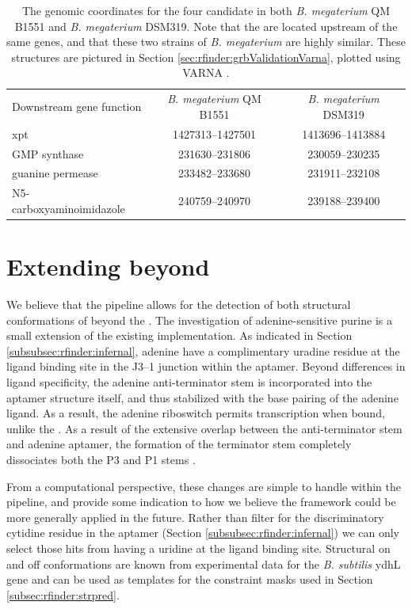 \begin{table}[!ht]
\centering
\begin{tabularx}{\linewidth}{*{1}{L} *{2}{C}}
  \toprule
  \small{Downstream gene function} & \small{{\em B. megaterium} QM B1551} & \small{{\em B. megaterium} DSM319} \\
  \cmidrule(lr){1-3}
  \small{xpt} & 1427313--1427501 & 1413696--1413884 \\[1ex]
  \small{GMP synthase} & 231630--231806 & 230059--230235 \\[1ex]
  \small{guanine permease} & 233482--233680 & 231911--232108 \\[1ex]
  \small{N5-carboxyaminoimidazole} & 240759--240970 & 239188--239400 \\
  \bottomrule
\end{tabularx}
\caption{The genomic coordinates for the four candidate \grbs in both
{\em B. megaterium} QM B1551 and {\em B. megaterium} DSM319. Note that the
\grbs are located upstream of the same genes, and that these two strains of
{\em B. megaterium} are highly similar. These structures are pictured in
Section \ref{sec:rfinder:grbValidationVarna}, plotted using VARNA
\citep{darty:2009gt}.}
\label{table:rfinderCandidateLocs}
\end{table}

\section{Extending beyond \grbs}
\label{sec:rfinder:ext}

We believe that the \rfinder pipeline allows for the detection of both structural
conformations of \rbs beyond the \grb. The investigation of
adenine-sensitive purine \rbs is a small extension of the existing
implementation. As indicated in Section \ref{subsubsec:rfinder:infernal}, adenine
\rbs have a complimentary uradine residue at the ligand binding site in
the J3--1 junction within the aptamer. Beyond differences in ligand specificity,
the adenine \rb anti-terminator stem is incorporated into the aptamer structure
itself, and thus stabilized with the base pairing of the adenine ligand. As a
result, the adenine riboswitch permits transcription when bound, unlike the \grb.
As a result of the extensive overlap between the anti-terminator stem and adenine
\rb aptamer, the formation of the terminator stem completely dissociates both the
P3 and P1 stems \citep{mandal2004a}.

From a computational perspective, these changes are simple to handle within the
\rfinder pipeline, and provide some indication to how we believe the framework
could be more generally applied in the future. Rather than filter for the
discriminatory cytidine residue in the \rb aptamer (Section \ref{subsubsec:rfinder:infernal}) we can only select those hits from \infernal having a uridine at the
ligand binding site. Structural on and off conformations are known from
experimental data for the {\em B. subtilis} ydhL gene \citep{mandal2004a} and can
be used as templates for the constraint masks used in Section \ref{subsec:rfinder:strpred}.

